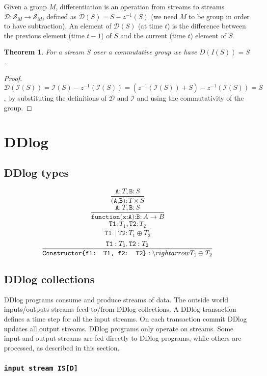 \documentclass[10pt]{article}
\newcommand{\stream}[1]{\ensuremath{\mathcal{S}_{#1}}}
\newcommand{\zm}{\ensuremath{z^{-1}}}
\newtheorem{theorem}{Theorem}[section]
\newcommand{\code}[1]{\texttt{#1}}
\newcommand{\I}{\mathcal{I}}
\newcommand{\D}{\mathcal{D}}
\begin{document}
Given a group $M$, differentiation is an operation from streams to
streams $\D : \stream{M} \rightarrow \stream{M}$, defined as $\D(S) =
S - \zm(S)$ (we need $M$ to be group in order to have subtraction).
An element of $\D(S)$ (at time $t$) is the difference between the
previous element (time $t-1$) of $S$ and the current (time $t$)
element of $S$.

\begin{theorem}
For a stream $S$ over a commutative group we have $D(I(S)) = S$.
\end{theorem}

\begin{proof}
$\D(\I(S)) = \I(S) - \zm(\I(S)) = (\zm(\I(S)) + S) - \zm(\I(S)) = S$, by
  substituting the definitions of $\D$ and $\I$ and using the
  commutativity of the group.
\end{proof}

\section{DDlog}

\subsection{DDlog types}

\[\frac{\code{A}: T, \code{B}: S}{\code{(A,B)}: T \times S}\]
\[\frac{\code{A}: T, \code{B}: S}{\code{function(x:A):B}: A \rightarrow B}\]
\[\frac{\code{T1}: T_1, \code{T2}: T_2}{\code{T1 | T2} : T_1 \oplus T_2}\]
\[\frac{\code{T1}: T_1, \code{T2}: T_2}{\code{Constructor\{f1: T1, f2:
    T2\}} : \string \rightarrow T_1 \oplus T_2}\]

\subsection{DDlog collections}

DDlog programs consume and produce streams of data.  The outside world
inputs/outputs streams feed to/from DDlog collections.  A DDlog
transaction defines a time step for all the input streams.  On each
transaction commit DDlog updates all output streams.  DDlog programs
only operate on streams.  Some input and output streams are fed
directly to DDlog programs, while others are processed, as described
in this section.

\subsubsection{\code{input stream IS[D]}}
\end{document}
